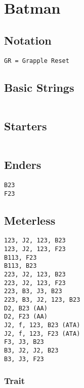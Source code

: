\documentclass[main.tex]{subfiles}
\begin{document}
\chapter{Batman}

\section{Notation}
\begin{lstlisting}[language=FG]
GR = Grapple Reset
\end{lstlisting}


\section{Basic Strings}

\begin{lstlisting}[language=FG]
\end{lstlisting}

\section{Starters}
\begin{lstlisting}[language=FG]

\end{lstlisting}

\section{Enders}

\begin{lstlisting}[language=FG]
B23
F23
\end{lstlisting}

\section{Meterless}

\begin{lstlisting}[language=FG]
123, J2, 123, B23
123, J2, 123, F23
B113, F23
B113, B23
223, J2, 123, B23
223, J2, 123, F23
223, B3, J3, B23
223, B3, J2, 123, B23
D2, B23 (AA)
D2, F23 (AA)
J2, f, 123, B23 (ATA)
J2, f, 123, F23 (ATA)
F3, J3, B23
B3, J2, J2, B23
B3, J3, F23
\end{lstlisting}

\subsection{Trait}
\end{document}
